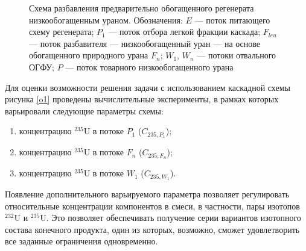 \begin{figure}[ht]
  \caption{Схема разбавления предварительно обогащенного регенерата низкообогащенным ураном. Обозначения: $E$ --- поток питающего схему регенерата; $P_1$ --- поток отбора легкой фракции каскада; $F_{leu}$ --- поток разбавителя --- низкообогащенный уран --- на основе обогащенного природного урана $F_n$; $W_1$, $W_n$ --- потоки отвального ОГФУ; $P$ --- поток товарного низкообогащенного урана}\label{ord_leu}
\end{figure}

Для оценки возможности решения задачи с использованием каскадной схемы рисунка \ref{o1} проведены вычислительные эксперименты, в рамках которых варьировали следующие параметры схемы:
\begin{enumerate}
  \item концентрацию $^{235}$U в потоке $P_1$ ($C_{235, P_1}$);
  \item концентрацию $^{235}$U в потоке $F_n$ ($C_{235, F_n}$);
  \item концентрацию $^{235}$U в потоке $W_1$ ($C_{235, W_1}$).
\end{enumerate}

Появление дополнительного варьируемого параметра позволяет регулировать относительные концентрации компонентов в смеси, в частности, пары изотопов $^{232}$U и $^{235}$U. Это позволяет обеспечивать получение серии вариантов изотопного состава конечного продукта, один из которых, возможно, сможет удовлетворить все заданные ограничения одновременно. 

